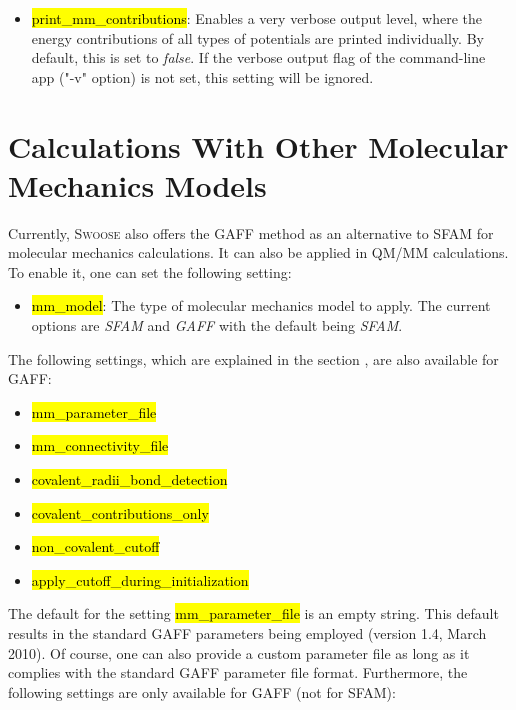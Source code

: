 \documentclass[]{tufte-book}
\begin{document}
{{\begin{itemize}
\item \hl{print\_mm\_contributions}: Enables a very verbose output level, where the energy contributions of all types of potentials are printed individually. By default, this is set to \textit{false}. If the verbose output flag of the command-line app ("-v" option) is not set, this setting will be ignored.
\end{itemize}

\chapter{Calculations With Other Molecular Mechanics Models}\label{ch:mm_calculation_gaff}

Currently, \textsc{Swoose} also offers the GAFF method\cite{gaff} as an alternative to SFAM for molecular mechanics calculations. It can also be applied in QM/MM calculations. To enable it, one can set the following setting:
\begin{itemize}
\item \hl{mm\_model}: The type of molecular mechanics model to apply. The current options are \textit{SFAM} and \textit{GAFF} with the default being \textit{SFAM}.
\end{itemize}

The following settings, which are explained in the section , are also available for GAFF:

\begin{itemize}
\item \hl{mm\_parameter\_file}
\item \hl{mm\_connectivity\_file}
\item \hl{covalent\_radii\_bond\_detection}
\item \hl{covalent\_contributions\_only}
\item \hl{non\_covalent\_cutoff}
\item \hl{apply\_cutoff\_during\_initialization}
\end{itemize}

The default for the setting \hl{mm\_parameter\_file} is an empty string. This default results in the standard GAFF parameters being employed (version 1.4, March 2010). Of course, one can also provide a custom parameter file as long as it complies with the standard GAFF parameter file format.
Furthermore, the following settings are only available for GAFF (not for SFAM):

}}
\end{document}
